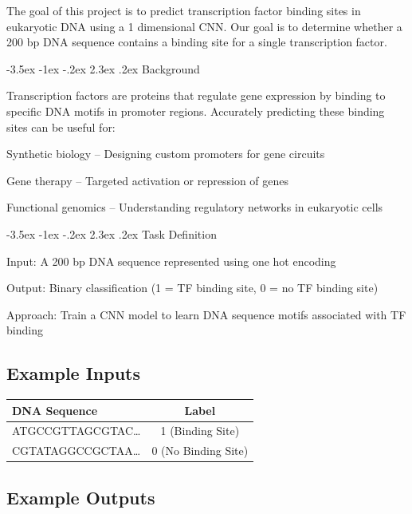 \documentclass{report}
\makeatletter
\renewcommand\section{\@startsection{section}{1}{\z@}%
  {-3.5ex \@plus -1ex \@minus -.2ex}%
  {2.3ex \@plus.2ex}%
  {\normalfont\Large\bfseries}}
\makeatother
\begin{document}
The goal of this project is to predict transcription factor binding
sites in eukaryotic DNA using a 1 dimensional CNN. Our goal is to
determine whether a 200 bp DNA sequence contains a binding site for a
single transcription factor.

\newpage

\section{Background}\label{background}

Transcription factors are proteins that regulate gene expression by
binding to specific DNA motifs in promoter regions. Accurately
predicting these binding sites can be useful for:

Synthetic biology -- Designing custom promoters for gene circuits

Gene therapy -- Targeted activation or repression of genes

Functional genomics -- Understanding regulatory networks in eukaryotic
cells

\section{Task Definition}\label{task-definition}

Input: A 200 bp DNA sequence represented using one hot encoding

Output: Binary classification (1 = TF binding site, 0 = no TF binding
site)

Approach: Train a CNN model to learn DNA sequence motifs associated with
TF binding

\subsection{Example Inputs}\label{example-inputs}

\begin{longtable}[]{@{}lc@{}}
\toprule\noalign{}
DNA Sequence & Label \\
\midrule\noalign{}
\endhead
\bottomrule\noalign{}
\endlastfoot
ATGCCGTTAGCGTAC\ldots{} & 1 (Binding Site) \\
CGTATAGGCCGCTAA\ldots{} & 0 (No Binding Site) \\
\end{longtable}

\subsection{Example Outputs}\label{example-outputs}
\end{document}
